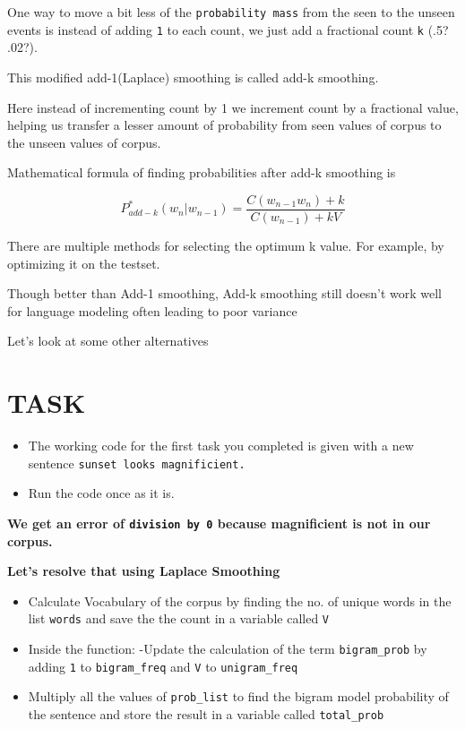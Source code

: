 \documentclass[11pt]{article}
\begin{document}
One way to move a bit less of the \texttt{probability\ mass} from the
seen to the unseen events is instead of adding \texttt{1} to each count,
we just add a fractional count \texttt{k} (.5? .02?).

This modified add-1(Laplace) smoothing is called add-k smoothing.

Here instead of incrementing count by 1 we increment count by a
fractional value, helping us transfer a lesser amount of probability
from seen values of corpus to the unseen values of corpus.

Mathematical formula of finding probabilities after add-k smoothing is

\[ P^*_{add-k}(w_n|w_{n-1}) = \frac{C(w_{n-1}w_n) + k}{C(w_{n-1}) + kV} \]

There are multiple methods for selecting the optimum k value. For
example, by optimizing it on the testset.

Though better than Add-1 smoothing, Add-k smoothing still doesn't work
well for language modeling often leading to poor variance

Let's look at some other alternatives

    \hypertarget{task}{%
\section{TASK}\label{task}}

\begin{itemize}
\item
  The working code for the first task you completed is given with a new
  sentence \texttt{sunset\ looks\ magnificient.}
\item
  Run the code once as it is.
\end{itemize}

\textbf{We get an error of \texttt{division\ by\ 0} because magnificient
is not in our corpus.}

\textbf{Let's resolve that using Laplace Smoothing}

\begin{itemize}
\item
  Calculate Vocabulary of the corpus by finding the no. of unique words
  in the list \texttt{\textquotesingle{}words\textquotesingle{}} and
  save the the count in a variable called
  \texttt{\textquotesingle{}V\textquotesingle{}}
\item
  Inside the function: -Update the calculation of the term
  \texttt{\textquotesingle{}bigram\_prob\textquotesingle{}} by adding
  \texttt{1} to
  \texttt{\textquotesingle{}bigram\_freq\textquotesingle{}} and
  \texttt{V} to
  \texttt{\textquotesingle{}unigram\_freq\textquotesingle{}}
\item
  Multiply all the values of
  \texttt{\textquotesingle{}prob\_list\textquotesingle{}} to find the
  bigram model probability of the sentence and store the result in a
  variable called \texttt{total\_prob}
\end{itemize}
\end{document}
